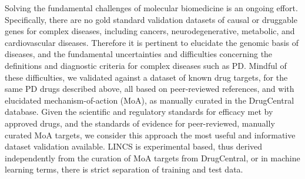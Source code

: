 Solving the fundamental challenges of molecular biomedicine is an ongoing effort. Specifically, there are no gold standard validation datasets of causal or druggable genes for complex diseases, including cancers, neurodegenerative, metabolic, and cardiovascular diseases. Therefore it is pertinent to elucidate the genomic basis of diseases, and the fundamental uncertainties and difficulties concerning the definitions and diagnostic criteria for complex diseases such as PD. Mindful of these difficulties, we validated against a dataset of known drug targets, for the same PD drugs described above, all based on peer-reviewed references, and with elucidated mechanism-of-action (MoA), as manually curated in the DrugCentral database. Given the scientific and regulatory standards for efficacy met by approved drugs, and the standards of evidence for peer-reviewed, manually curated MoA targets, we consider this approach the most useful and informative dataset validation available. LINCS is experimental based, thus derived independently from the curation of MoA targets from DrugCentral, or in machine learning terms, there is strict separation of training and test data.

